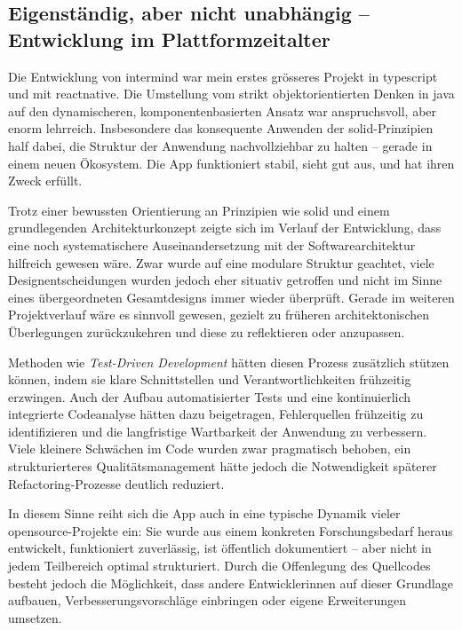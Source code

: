 \subsection{Eigenständig, aber nicht unabhängig -- Entwicklung im Plattformzeitalter}

Die Entwicklung von \gls{intermind} war mein erstes grösseres Projekt in \gls{typescript} und mit \gls{reactnative}. Die Umstellung vom strikt objektorientierten Denken in \gls{java} auf den dynamischeren, komponentenbasierten Ansatz war anspruchsvoll, aber enorm lehrreich. Insbesondere das konsequente Anwenden der \gls{solid}-Prinzipien half dabei, die Struktur der Anwendung nachvollziehbar zu halten -- gerade in einem neuen Ökosystem. Die App funktioniert stabil, sieht gut aus, und hat ihren Zweck erfüllt.

Trotz einer bewussten Orientierung an Prinzipien wie \gls{solid} und einem grundlegenden Architekturkonzept zeigte sich im Verlauf der Entwicklung, dass eine noch systematischere Auseinandersetzung mit der Softwarearchitektur hilfreich gewesen wäre. Zwar wurde auf eine modulare Struktur geachtet, viele Designentscheidungen wurden jedoch eher situativ getroffen und nicht im Sinne eines übergeordneten Gesamtdesigns immer wieder überprüft. Gerade im weiteren Projektverlauf wäre es sinnvoll gewesen, gezielt zu früheren architektonischen Überlegungen zurückzukehren und diese zu reflektieren oder anzupassen.

Methoden wie \emph{Test-Driven Development} hätten diesen Prozess zusätzlich stützen können, indem sie klare Schnittstellen und Verantwortlichkeiten frühzeitig erzwingen. Auch der Aufbau automatisierter Tests und eine kontinuierlich integrierte Codeanalyse hätten dazu beigetragen, Fehlerquellen frühzeitig zu identifizieren und die langfristige Wartbarkeit der Anwendung zu verbessern. Viele kleinere Schwächen im Code wurden zwar pragmatisch behoben, ein strukturierteres Qualitätsmanagement hätte jedoch die Notwendigkeit späterer Refactoring-Prozesse deutlich reduziert.

In diesem Sinne reiht sich die App auch in eine typische Dynamik vieler \gls{opensource}-Projekte ein: Sie wurde aus einem konkreten Forschungsbedarf heraus entwickelt, funktioniert zuverlässig, ist öffentlich dokumentiert -- aber nicht in jedem Teilbereich optimal strukturiert. Durch die Offenlegung des Quellcodes besteht jedoch die Möglichkeit, dass andere Entwickler\genderstern innen auf dieser Grundlage aufbauen, Verbesserungsvorschläge einbringen oder eigene Erweiterungen umsetzen.

